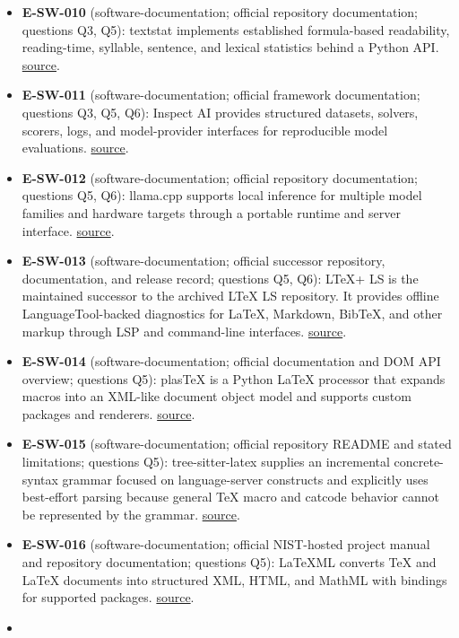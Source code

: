 \documentclass[11pt]{article}
\begin{document}
\begin{itemize}
\item
  \textbf{E-SW-010} (software-documentation; official repository documentation; questions Q3, Q5): textstat implements established formula-based readability, reading-time, syllable, sentence, and lexical statistics behind a Python API. \href{https://github.com/textstat/textstat}{source}.
\item
  \textbf{E-SW-011} (software-documentation; official framework documentation; questions Q3, Q5, Q6): Inspect AI provides structured datasets, solvers, scorers, logs, and model-provider interfaces for reproducible model evaluations. \href{https://inspect.aisi.org.uk/}{source}.
\item
  \textbf{E-SW-012} (software-documentation; official repository documentation; questions Q5, Q6): llama.cpp supports local inference for multiple model families and hardware targets through a portable runtime and server interface. \href{https://github.com/ggml-org/llama.cpp}{source}.
\item
  \textbf{E-SW-013} (software-documentation; official successor repository, documentation, and release record; questions Q5, Q6): LTeX+ LS is the maintained successor to the archived LTeX LS repository. It provides offline LanguageTool-backed diagnostics for LaTeX, Markdown, BibTeX, and other markup through LSP and command-line interfaces. \href{https://github.com/ltex-plus/ltex-ls-plus}{source}.
\item
  \textbf{E-SW-014} (software-documentation; official documentation and DOM API overview; questions Q5): plasTeX is a Python LaTeX processor that expands macros into an XML-like document object model and supports custom packages and renderers. \href{https://plastex.github.io/plastex/}{source}.
\item
  \textbf{E-SW-015} (software-documentation; official repository README and stated limitations; questions Q5): tree-sitter-latex supplies an incremental concrete-syntax grammar focused on language-server constructs and explicitly uses best-effort parsing because general TeX macro and catcode behavior cannot be represented by the grammar. \href{https://github.com/latex-lsp/tree-sitter-latex}{source}.
\item
  \textbf{E-SW-016} (software-documentation; official NIST-hosted project manual and repository documentation; questions Q5): LaTeXML converts TeX and LaTeX documents into structured XML, HTML, and MathML with bindings for supported packages. \href{https://dlmf.nist.gov/LaTeXML/}{source}.
\item

\end{itemize}
\end{document}
